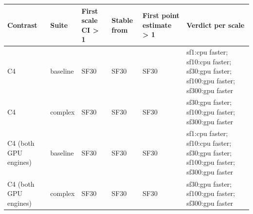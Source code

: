 \begin{tabular}{llllll}
\toprule
Contrast & Suite & First scale CI > 1 & Stable from & First point estimate > 1 & Verdict per scale \\
\midrule
C4 & baseline & SF30 & SF30 & SF30 & sf1:cpu faster; sf10:cpu faster; sf30:gpu faster; sf100:gpu faster; sf300:gpu faster \\
C4 & complex & SF30 & SF30 & SF30 & sf30:gpu faster; sf100:gpu faster; sf300:gpu faster \\
C4 (both GPU engines) & baseline & SF30 & SF30 & SF30 & sf1:cpu faster; sf10:cpu faster; sf30:gpu faster; sf100:gpu faster; sf300:gpu faster \\
C4 (both GPU engines) & complex & SF30 & SF30 & SF30 & sf30:gpu faster; sf100:gpu faster; sf300:gpu faster \\
\bottomrule
\end{tabular}
